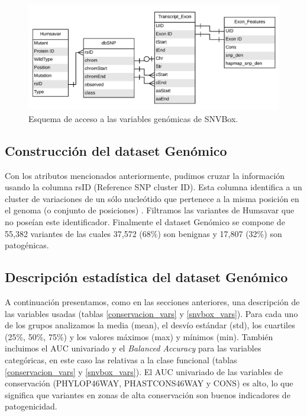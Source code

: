 \begin{figure}[H]
\centering
    \includegraphics[scale=0.55]{documents/latex/figures/3/genomic/exon_diagram.pdf}
    \caption{Esquema de acceso a las variables genómicas de SNVBox.}
    \label{fig:exon_diagram}
\end{figure}

\subsection{Construcción del dataset Genómico}

Con los atributos mencionados anteriormente, pudimos cruzar la información usando la columna rsID (Reference SNP cluster ID). Esta columna identifica a un cluster de variaciones de un sólo nucleótido que pertenece a la misma posición en el genoma (o conjunto de posiciones) \cite{Ostell2007}. Filtramos las variantes de Humsavar que no poseían este identificador. Finalmente el dataset Genómico se compone de 55,382 variantes de las cuales 37,572 (68\%) son benignas y 17,807 (32\%) son patogénicas. 

\subsection{Descripción estadística del dataset Genómico}

A continuación presentamos, como en las secciones anteriores, una descripción de las variables usadas (tablas \ref{conservacion_vars} y \ref{snvbox_vars}). Para cada uno de los grupos analizamos la media (mean), el desvío estándar (std), los cuartiles (25\%, 50\%, 75\%) y los valores máximos (max) y mínimos (min). También incluimos el AUC univariado y el \textit{Balanced Accuracy} para las variables categóricas, en este caso las relativas a la clase funcional (tablas \ref{conservacion_vars} y \ref{snvbox_vars}). El AUC univariado de las variables de conservación (PHYLOP46WAY, PHASTCONS46WAY y CONS) es alto, lo que significa que variantes en zonas de alta conservación son buenos indicadores de patogenicidad.

